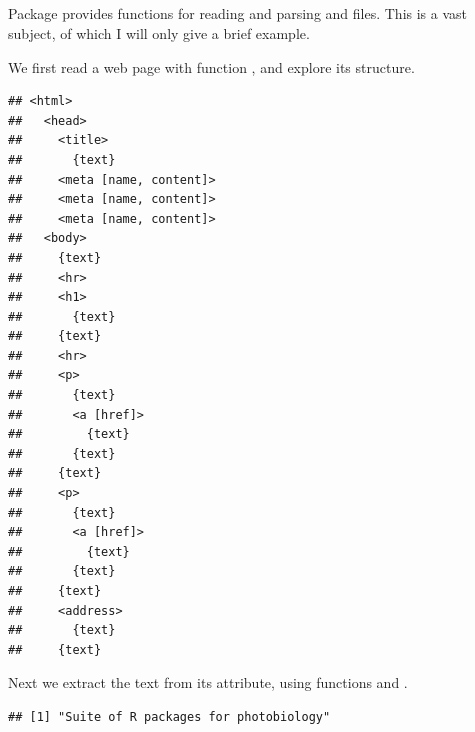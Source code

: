 \documentclass[krantz2]{krantz}\usepackage{knitr}
\begin{document}
\subsection[`xml2']{}



Package  provides functions for reading and parsing  and  files. This is a vast subject, of which I will only give a brief example.

We first read a web page with function , and explore its structure.

\begin{knitrout}\footnotesize
{}\color{fgcolor}\begin{kframe}
\begin{alltt}
 \hlkwb{<-} \hlstd{(}\hlstd{)}
\end{alltt}
\begin{verbatim}
## <html>
##   <head>
##     <title>
##       {text}
##     <meta [name, content]>
##     <meta [name, content]>
##     <meta [name, content]>
##   <body>
##     {text}
##     <hr>
##     <h1>
##       {text}
##     {text}
##     <hr>
##     <p>
##       {text}
##       <a [href]>
##         {text}
##       {text}
##     {text}
##     <p>
##       {text}
##       <a [href]>
##         {text}
##       {text}
##     {text}
##     <address>
##       {text}
##     {text}
\end{verbatim}
\end{kframe}
\end{knitrout}

Next we extract the text from its  attribute, using functions  and .

\begin{knitrout}\footnotesize
{}\color{fgcolor}\begin{kframe}
\begin{alltt}
\hlstd{(} \hlstd{))}
\end{alltt}
\begin{verbatim}
## [1] "Suite of R packages for photobiology"
\end{verbatim}
\end{kframe}
\end{knitrout}
\end{document}
